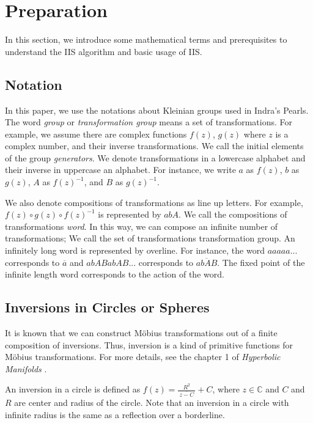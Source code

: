 
\section{Preparation}

In this section, we introduce some mathematical terms and prerequisites
to understand the IIS algorithm and basic usage of IIS.

\subsection{Notation}

In this paper, we use the notations about Kleinian groups used in
Indra's Pearls.
The word \textit{group} or \textit{transformation group} means a set of
transformations. 
For example, we assume there are complex functions $f(z)$, $g(z)$
where $z$ is a complex number, and their inverse transformations. %
We call the initial elements of the group \textit{generators}.
We denote transformations in a lowercase alphabet and 
their inverse in uppercase an alphabet.
For instance, we write $a$ as $f(z)$, $b$ as $g(z)$, $A$ as $f(z)^{-1}$,
and $B$ as $g(z)^{-1}$.

We also denote compositions of transformations as line up letters.
For example, $f(z) \circ g(z) \circ f(z)^{-1}$ is represented by $abA$.
We call the compositions of transformations \textit{word}.
In this way, we can compose an infinite number of transformations;
We call the set of transformations transformation group.
An infinitely long word is represented by overline.
For instance, the word $aaaaa...$ corresponds to $\overline{a}$ and
$abABabAB...$ corresponds to $\overline{abAB}$.
The fixed point of the infinite length word corresponds to the action of
the word.

\subsection{Inversions in Circles or Spheres}

It is known that we can construct M\"obius transformations out of a finite
composition of inversions. Thus, inversion is a kind of primitive
functions for M\"obius transformations.
For more details, see the chapter 1 of \textit{Hyperbolic Manifolds}
 \cite{marden_2016}.

An inversion in a circle is defined as $f(z) = \frac{R^2}{~\overline{z -C}~} + C$,
where $z \in \mathbb{C}$ and $C$ and $R$ are center and radius of the circle.
Note that an inversion in a circle with infinite radius is the same as
a reflection over a borderline.

